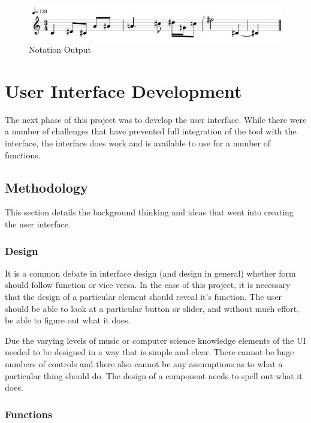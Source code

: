 \begin{figure}[!htbp]
	\centering
	\caption{Notation Output}
	\includegraphics[scale=0.4]{images/notation.png}
\end{figure}

\section{User Interface Development}
\label{sec:userinterfacedevelopment}

The next phase of this project was to develop the user interface.  While there were a number of challenges that have prevented full integration of the tool with the interface, the interface does work and is available to use for a number of functions.

\subsection{Methodology}
\label{subsec:methodology}

This section details the background thinking and ideas that went into creating the user interface.

\subsubsection{Design}
\label{subsubsec:methodologydesign}

It is a common debate in interface design (and design in general) whether form should follow function or vice versa.  In the case of this project, it is necessary that the design of a particular element should reveal it's function.  The user should be able to look at a particular button or slider, and without much effort, be able to figure out what it does.

\vspace{\baselineskip}

Due the varying levels of music or computer science knowledge elements of the UI needed to be designed in a way that is simple and clear.  There cannot be huge numbers of controls and there also cannot be any assumptions as to what a particular thing should do.  The design of a component needs to spell out what it does.

\subsubsection{Functions}
\label{subsubsec:methodologyfunctions}

